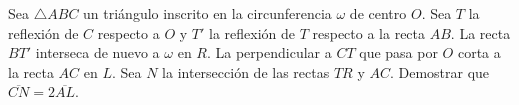 Sea $\triangle ABC$ un triángulo inscrito en la circunferencia $\omega$ de centro $O$.  Sea $T$ la reflexión de $C$ respecto a $O$ y $T'$ la reflexión de $T$ respecto a la recta $AB$. La recta $BT'$ interseca de nuevo a $\omega$ en $R$. La perpendicular a $CT$ que pasa por $O$ corta a la recta $AC$ en $L$. Sea $N$ la intersección de las rectas $TR$ y $AC$. Demostrar que $\overline{CN}=2\overline{AL}$.
